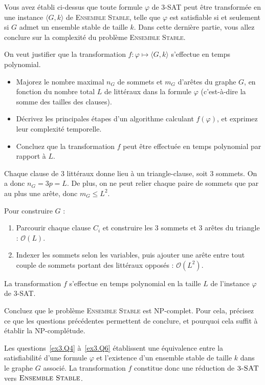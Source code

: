 \begin{exercice}
  Vous avez établi ci-dessus que toute formule $\varphi$ de \textsc{3-SAT} peut être transformée
  en une instance $\langle G, k \rangle$ de \textsc{Ensemble Stable}, telle que $\varphi$
  est satisfiable si et seulement si $G$ admet un ensemble stable de taille $k$.
  Dans cette dernière partie, vous allez conclure sur la complexité du problème \textsc{Ensemble Stable}.

  \begin{questions}
  \item\label{ex3.Q7}
    On veut justifier que la transformation $f : \varphi \mapsto \langle G, k \rangle$ s'effectue en temps polynomial.
    \begin{itemize}
    \item Majorez le nombre maximal $n_G$ de sommets et $m_G$ d'arêtes du graphe $G$, en fonction
      du nombre total $L$ de littéraux dans la formule $\varphi$ (c'est-à-dire la somme des tailles des clauses).
    \item Décrivez les principales étapes d'un algorithme calculant $f(\varphi)$, et exprimez leur complexité temporelle.
    \item Concluez que la transformation $f$ peut être effectuée en temps polynomial par rapport à $L$.
    \end{itemize}
  \end{questions}
  \begin{corrections}
    Chaque clause de 3 littéraux donne lieu à un triangle-clause, soit 3 sommets. On a donc $n_G = 3p = L$. De plus, on ne peut relier chaque paire de sommets que
    par au plus une arête, donc $m_G \le L^2$. 

    Pour construire $G$ :
    \begin{enumerate}
    \item Parcourir chaque clause $C_i$ et construire les 3 sommets et 3 arêtes du triangle : $\mathcal{O}(L)$.
    \item Indexer les sommets selon les variables, puis ajouter une arête entre tout couple de sommets portant des littéraux opposés : $\mathcal{O}(L^2)$.
    \end{enumerate}
    La transformation $f$ s’effectue en temps polynomial en la taille $L$ de l’instance $\varphi$ de \textsc{3-SAT}.
  \end{corrections}

  \begin{questions}
  \item\label{ex3.Q9} Concluez que le problème \textsc{Ensemble Stable} est NP-complet. Pour cela,
    précisez ce que les questions précédentes permettent de conclure, et pourquoi cela suffit à établir la NP-complétude.
  \end{questions}
  \begin{corrections}
    Les questions~\ref{ex3.Q4} à~\ref{ex3.Q6} établissent une équivalence entre la satisfiabilité d’une formule $\varphi$ et l’existence
    d’un ensemble stable de taille $k$ dans le graphe $G$ associé.
    La transformation $f$ constitue donc une réduction de $\textsc{3-SAT}$ vers $\textsc{Ensemble Stable}$.


\end{corrections}
\end{exercice}
